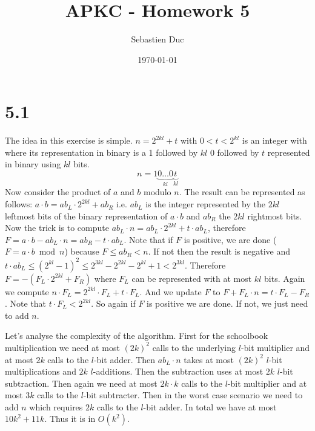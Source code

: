 \documentclass[12pt,a4paper]{article}
\title{APKC - Homework 5}
\author{Sebastien Duc}
\date{\today}
\begin{document}
    \maketitle

    \section*{5.1}
    The idea in this exercise is simple. $n=2^{2kl} + t$ with $0 < t < 2^{kl}$ is an integer with where its representation in binary
    is a 1 followed by $kl$ 0 followed by $t$ represented in binary using $kl$ bits.
    \[
        n = 1 \underbrace{0 \dots 0}_{kl} \underbrace{t}_{kl}
    \]
    Now consider the product of $a$ and $b$ modulo $n$. The result can be represented as follows: $a \cdot b = ab_L \cdot 2^{2kl} + ab_R$ i.e. $ab_L$ is the integer represented 
    by the $2kl$ leftmost bits of the binary representation of $a \cdot b$ and $ab_R$ the $2kl$ rightmost bits.
    Now the trick is to compute $ab_L \cdot n = ab_L \cdot 2^{2kl} + t \cdot ab_L$, therefore $F = a \cdot b - ab_L \cdot n = ab_R - t \cdot ab_L$. 
    Note that if $F$ is positive, we are done ($F = a\cdot b \bmod n$) because $F  \leq ab_R < n$.
    If not then the result is negative and $t \cdot ab_L \leq (2^{kl} - 1)^2 \leq 2^{3kl} - 2^{2kl} - 2^{kl} + 1 < 2^{3kl}$.
    Therefore $F = -(F_L \cdot 2^{2kl} + F_R)$ where $F_L$ can be represented with at most $kl$ bits.
    Again we compute $n \cdot F_L = 2^{2kl} \cdot F_L + t \cdot F_L$. And we update $F$ to $F + F_L \cdot n = t\cdot F_L - F_R$.
    Note that $t \cdot F_L < 2^{2kl}$. So again if $F$ is positive we are done. If not, we just need to add $n$.

    Let's analyse the complexity of the algorithm. First for the schoolbook multiplication we need at most $(2k)^2$ calls to the underlying $l$-bit multiplier and at most
    $2k$ calls to the $l$-bit adder. Then $ab_L \cdot n$ takes at most $(2k)^2$ $l$-bit multiplications and $2k$ $l$-additions. 
    Then the subtraction uses at most $2k$ $l$-bit subtraction. Then again we need at most $2k \cdot k$ calls to the $l$-bit multiplier and at most $3k$ calls to the $l$-bit subtracter.
    Then in the worst case scenario we need to add $n$ which requires $2k$ calls to the $l$-bit adder.
    In total we have at most $10k^2 + 11k$. Thus it is in $O(k^2)$.
\end{document}
